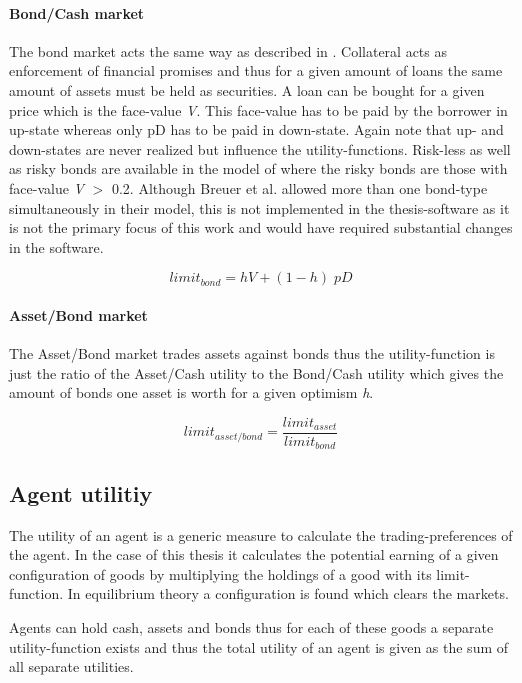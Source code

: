 \documentclass[../Bachelorarbeit.tex]{subfiles}
\begin{document}
\paragraph{Bond/Cash market}
The bond market acts the same way as described in \cite{Geanakoplos2009}. Collateral acts as enforcement of financial promises and thus for a given amount of loans the same amount of assets must be held as securities. A loan can be bought for a given price which is the face-value \textit{V}. This face-value has to be paid by the borrower in up-state whereas only pD has to be paid in down-state. Again note that up- and down-states are never realized but influence the utility-functions.
\medskip
Risk-less as well as risky bonds are available in the model of \cite{Breuer2015} where the risky bonds are those with face-value \textit{V} $>$ 0.2. Although Breuer et al. allowed more than one bond-type simultaneously in their model, this is not implemented in the thesis-software as it is not the primary focus of this work and would have required substantial changes in the software.

\begin{equation}
limit_{bond} = h V + ( 1 - h ) \; pD
\end{equation}

\paragraph{Asset/Bond market}
The Asset/Bond market trades assets against bonds thus the utility-function is just the ratio of the Asset/Cash utility to the Bond/Cash utility which gives the amount of bonds one asset is worth for a given optimism \textit{h}.

\begin{equation}
limit_{asset/bond} = \frac{limit_{asset}}{limit_{bond}}
\end{equation}

\subsection{Agent utilitiy}
The utility of an agent is a generic measure to calculate the trading-preferences of the agent. In the case of this thesis it calculates the potential earning of a given configuration of goods by multiplying the holdings of a good with its limit-function. In equilibrium theory a configuration is found which clears the markets.

\medskip

Agents can hold cash, assets and bonds thus for each of these goods a separate utility-function exists and thus the total utility of an agent is given as the sum of all separate utilities.
\end{document}
